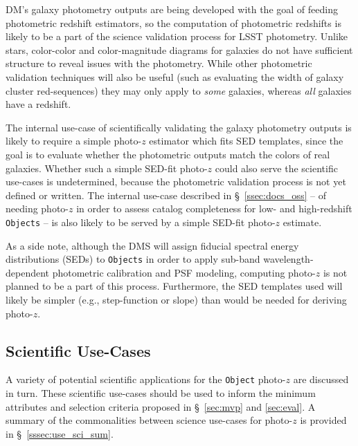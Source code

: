 \documentclass[DM,lsstdraft,toc]{lsstdoc}
\begin{document}
DM's galaxy photometry outputs are being developed with the goal of feeding photometric redshift estimators, so the computation of photometric redshifts is likely to be a part of the science validation process for LSST photometry. 
Unlike stars, color-color and color-magnitude diagrams for galaxies do not have sufficient structure to reveal issues with the photometry.
While other photometric validation techniques will also be useful (such as evaluating the width of galaxy cluster red-sequences) they may only apply to {\it some} galaxies, whereas {\it all} galaxies have a redshift. 

The internal use-case of scientifically validating the galaxy photometry outputs is likely to require a simple photo-$z$ estimator which fits SED templates, since the goal is to evaluate whether the photometric outputs match the colors of real galaxies.
Whether such a simple SED-fit photo-$z$ could also serve the scientific use-cases is undetermined, because the photometric validation process is not yet defined or written.
The internal use-case described in \S~\ref{ssec:docs_oss} -- of needing photo-$z$ in order to assess catalog completeness for low- and high-redshift {\tt Objects} -- is also likely to be served by a simple SED-fit photo-$z$ estimate.

As a side note, although the DMS will assign fiducial spectral energy distributions (SEDs) to {\tt Objects} in order to apply sub-band wavelength-dependent photometric calibration and PSF modeling, computing photo-$z$ is not planned to be a part of this process.
Furthermore, the SED templates used will likely be simpler (e.g., step-function or slope) than would be needed for deriving photo-$z$.

\subsection{Scientific Use-Cases}\label{ssec:use_sci}

A variety of potential scientific applications for the {\tt Object} photo-$z$ are discussed in turn. 
These scientific use-cases should be used to inform the minimum attributes and selection criteria proposed in \S~\ref{sec:mvp} and \ref{sec:eval}.
A summary of the commonalities between science use-cases for photo-$z$ is provided in \S~\ref{sssec:use_sci_sum}.
\end{document}
